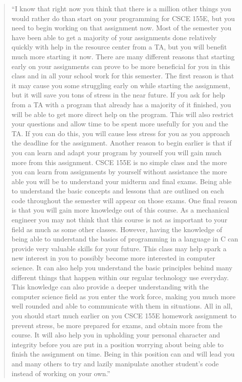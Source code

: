 \documentclass[12pt]{scrartcl}
\begin{document}
\begin{quote}
``I know that right now you think that there is a million other things you would rather do than start on your programming for CSCE 155E, but you need to begin working on that assignment now. Most of the semester you have been able to get a majority of your assignments done relatively quickly with help in the resource center from a TA, but you will benefit much more starting it now. There are many different reasons that starting early on your assignments can prove to be more beneficial for you in this class and in all your school work for this semester. 
	The first reason is that it may cause you some struggling early on while starting the assignment, but it will save you tons of stress in the near future. If you ask for help from a TA with a program that already has a majority of it finished, you will be able to get more direct help on the program. This will also restrict your questions and allow time to be spent more usefully for you and the TA. If you can do this, you will cause less stress for you as you approach the deadline for the assignment. 
	Another reason to begin earlier is that if you can learn and adapt your program by yourself you will gain much more from this assignment. CSCE 155E is no simple class and the more you can learn from assignments by yourself without assistance the more able you will be to understand your midterm and final exams. Being able to understand the basic concepts and lessons that are outlined on each code throughout the semester will appear on those exams. 
	One final reason is that you will gain more knowledge out of this course. As a mechanical engineer you may not think that this course is not as important to your field as much as some other classes. However, having the knowledge of being able to understand the basics of programming in a language in C can provide very valuable skills for your future. This class may help spark a new interest in you to possibly become more interested in computer science. It can also help you understand the basic principles behind many different things that happen within our regular technology use everyday. This knowledge can also provide a deeper understanding with the computer science field as you enter the work force, making you much more well rounded and able to communicate with them in situations.
	All in all, you should start much earlier on you CSCE 155E homework assignment to prevent stress, be more prepared for exams, and obtain more from the course. It will also help you in upholding your personal character and integrity before you are put in a position worrying about being able to finish the assignment on time. Being in this position can and will lead you and many others to try and lazily manipulate another student's code instead of working on your own.''
\end{quote}
\end{document}
